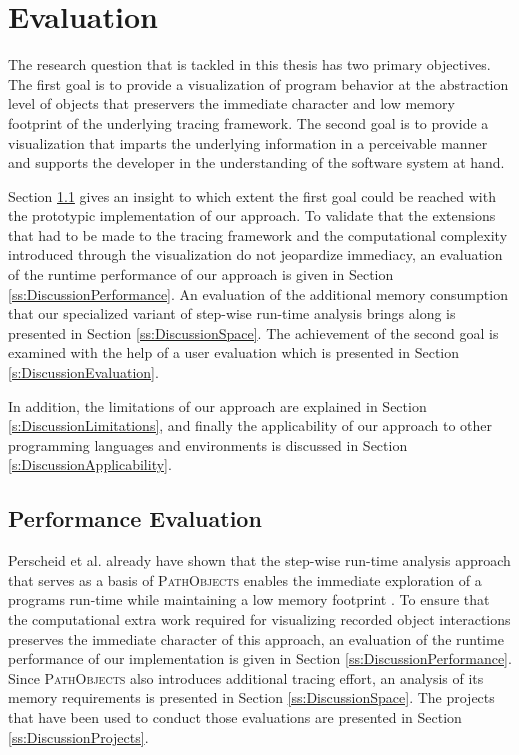 \chapter{Evaluation}
\label{c:discussion}
The research question that is tackled in this thesis has two primary objectives.
The first goal is to provide a visualization of program behavior at the abstraction level of objects that preservers the immediate character and low memory footprint of the underlying tracing framework.
The second goal is to provide a visualization that imparts the underlying information in a perceivable manner and supports the developer in the understanding of the software system at hand.

Section \ref{s:DiscussionPerformance} gives an insight to which extent the first goal could be reached with the prototypic implementation of our approach.
To validate that the extensions that had to be made to the tracing framework and the computational complexity introduced through the visualization do not jeopardize immediacy, an evaluation of the runtime performance of our approach is given in Section \ref{ss:DiscussionPerformance}.
An evaluation of the additional memory consumption that our specialized variant of  step-wise run-time analysis brings along is presented in Section \ref{ss:DiscussionSpace}. 
The achievement of the second goal is examined with the help of a user evaluation which is presented in Section \ref{s:DiscussionEvaluation}.

In addition, the limitations of our approach are explained in Section \ref{s:DiscussionLimitations}, and finally the applicability of our approach to other programming languages and environments is discussed in Section \ref{s:DiscussionApplicability}.

\section{Performance Evaluation}
\label{s:DiscussionPerformance}
Perscheid et al. already have shown that the step-wise run-time analysis approach that serves as a basis of \textsc{PathObjects} enables the immediate exploration of a programs run-time while maintaining a low memory footprint  \cite{perscheid_immediacy_2010}.
To ensure that the computational extra work required for visualizing recorded object interactions preserves the immediate character of this approach, an evaluation of the runtime performance of our implementation is given in Section \ref{ss:DiscussionPerformance}.
Since \textsc{PathObjects} also introduces additional tracing effort, an analysis of its memory requirements is presented in Section \ref{ss:DiscussionSpace}.
The projects that have been used to conduct those evaluations are presented in Section \ref{ss:DiscussionProjects}.

